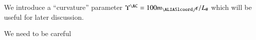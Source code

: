 \begin{draft}
        We introduce a ``curvature'' parameter $\Upsilon^{\AC}=  100m_{\lcoord{j}}\epsilon /L_\#$ which will be useful for later discussion. 


        
    We need to be careful \blahblah

\end{draft} 






